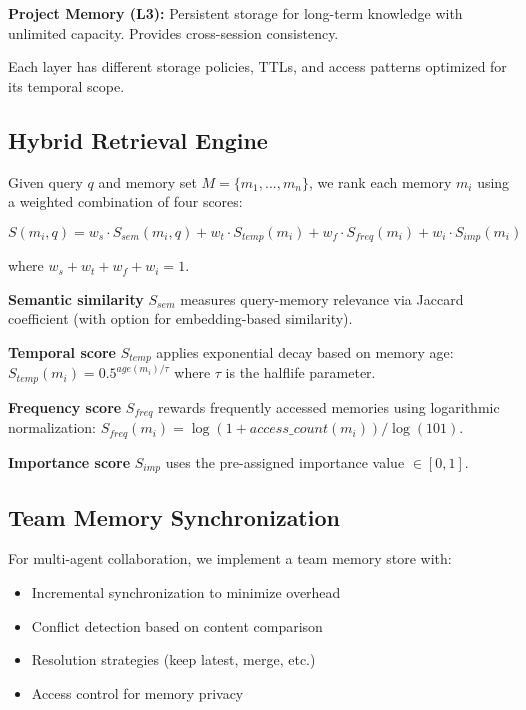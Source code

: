 \documentclass{article} %
\begin{document}
\textbf{Project Memory (L3):} Persistent storage for long-term knowledge with
unlimited capacity. Provides cross-session consistency.

Each layer has different storage policies, TTLs, and access patterns optimized
for its temporal scope.

\subsection{Hybrid Retrieval Engine}

Given query $q$ and memory set $M = \{m_1, ..., m_n\}$, we rank each memory $m_i$
using a weighted combination of four scores:

\begin{equation}
S(m_i, q) = w_s \cdot S_{sem}(m_i, q) + w_t \cdot S_{temp}(m_i) + w_f \cdot S_{freq}(m_i) + w_i \cdot S_{imp}(m_i)
\end{equation}

where $w_s + w_t + w_f + w_i = 1$.

\textbf{Semantic similarity} $S_{sem}$ measures query-memory relevance via Jaccard
coefficient (with option for embedding-based similarity).

\textbf{Temporal score} $S_{temp}$ applies exponential decay based on memory age:
$S_{temp}(m_i) = 0.5^{age(m_i) / \tau}$ where $\tau$ is the halflife parameter.

\textbf{Frequency score} $S_{freq}$ rewards frequently accessed memories using
logarithmic normalization: $S_{freq}(m_i) = \log(1 + access\_count(m_i)) / \log(101)$.

\textbf{Importance score} $S_{imp}$ uses the pre-assigned importance value $\in [0,1]$.

\subsection{Team Memory Synchronization}

For multi-agent collaboration, we implement a team memory store with:

\begin{itemize}
\item Incremental synchronization to minimize overhead
\item Conflict detection based on content comparison
\item Resolution strategies (keep latest, merge, etc.)
\item Access control for memory privacy
\end{itemize}
\end{document}
